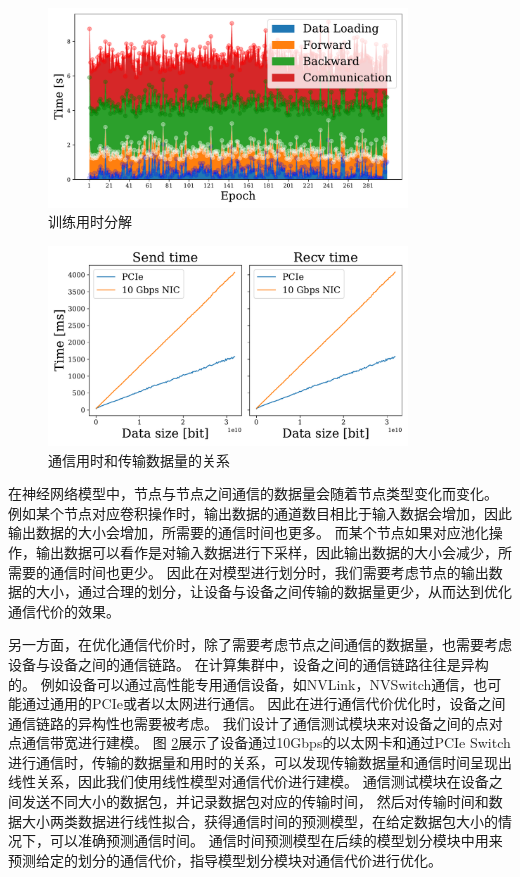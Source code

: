 \begin{figure}[h]
	\centering
	\includegraphics[width=0.85\textwidth]{figure/3-system/overhead_decomposition.pdf}
	\caption{训练用时分解}
	\label{fig:overhead}
\end{figure}

\begin{figure}[h]
	\centering
	\includegraphics[width=0.85\textwidth]{figure/3-system/commu.pdf}
	\caption{通信用时和传输数据量的关系}
	\label{fig:linear}
\end{figure}
在神经网络模型中，节点与节点之间通信的数据量会随着节点类型变化而变化。
例如某个节点对应卷积操作时，输出数据的通道数目相比于输入数据会增加，因此输出数据的大小会增加，所需要的通信时间也更多。
而某个节点如果对应池化操作，输出数据可以看作是对输入数据进行下采样，因此输出数据的大小会减少，所需要的通信时间也更少。
因此在对模型进行划分时，我们需要考虑节点的输出数据的大小，通过合理的划分，让设备与设备之间传输的数据量更少，从而达到优化通信代价的效果。

另一方面，在优化通信代价时，除了需要考虑节点之间通信的数据量，也需要考虑设备与设备之间的通信链路。
在计算集群中，设备之间的通信链路往往是异构的。
例如设备可以通过高性能专用通信设备，如NVLink，NVSwitch通信，也可能通过通用的PCIe或者以太网进行通信。
因此在进行通信代价优化时，设备之间通信链路的异构性也需要被考虑。
我们设计了通信测试模块来对设备之间的点对点通信带宽进行建模。
图 \ref{fig:linear}展示了设备通过10Gbps的以太网卡和通过PCIe Switch进行通信时，传输的数据量和用时的关系，可以发现传输数据量和通信时间呈现出线性关系，因此我们使用线性模型对通信代价进行建模。
通信测试模块在设备之间发送不同大小的数据包，并记录数据包对应的传输时间，
然后对传输时间和数据大小两类数据进行线性拟合，获得通信时间的预测模型，在给定数据包大小的情况下，可以准确预测通信时间。
通信时间预测模型在后续的模型划分模块中用来预测给定的划分的通信代价，指导模型划分模块对通信代价进行优化。

